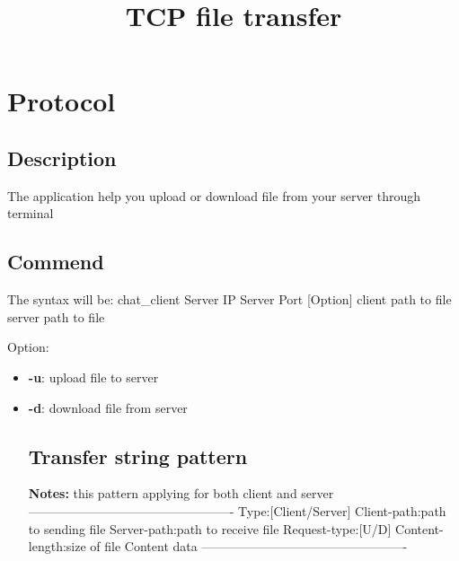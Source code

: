 \documentclass{article}
\title{TCP file transfer}
\begin{document}
\maketitle
\section{Protocol}
\subsection{Description}
The application help you upload or download file from your server through terminal
\subsection{Commend}
The syntax will be:
chat_client {Server IP} {Server Port} [Option] {client path to file} {server path to file}

Option:
\begin{itemize}
\item \textbf{-u}: upload file to server
\item \textbf{-d}: download file from server

\subsection{Transfer string pattern}
\textbf{Notes:} this pattern applying for both client and server\newline
-------------------------------------------------
Type:[Client/Server]
\n
Client-path:{path to sending file}
\n
Server-path:{path to receive file}
\n
Request-type:[U/D]
\n
Content-length:{size of file}
\n\n
{Content data}
-------------------------------------------------
\end{itemize}
\end{document}
